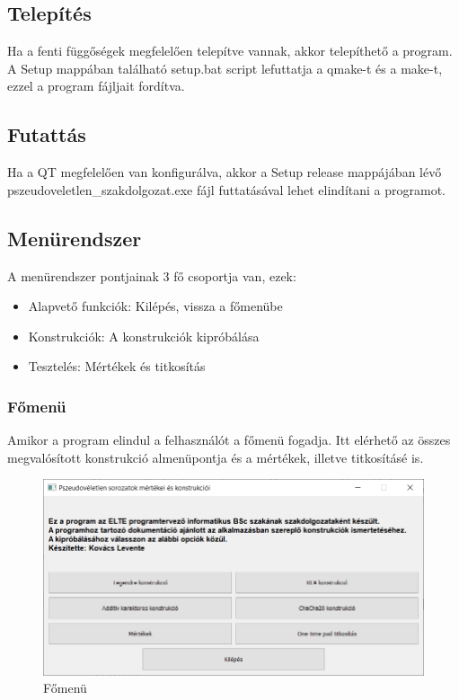 \documentclass[hidelinks, 12pt]{article}
\begin{document}
	\subsection{Telepítés}
	Ha a fenti függőségek megfelelően telepítve vannak, akkor telepíthető a program. A Setup mappában található setup.bat script lefuttatja a qmake-t és a make-t, ezzel a program fájljait fordítva.
	\subsection{Futattás}
	Ha a QT megfelelően van konfigurálva, akkor a Setup release mappájában lévő pszeudoveletlen\_szakdolgozat.exe fájl futtatásával lehet elindítani a programot.
	\subsection{Menürendszer}
	A menürendszer pontjainak 3 fő csoportja van, ezek:
	\begin{itemize}
		\item Alapvető funkciók: Kilépés, vissza a főmenübe
		\item Konstrukciók: A konstrukciók kipróbálása
		\item Tesztelés: Mértékek és titkosítás
	\end{itemize}
	\subsubsection{Főmenü}
	Amikor a program elindul a felhasználót a főmenü fogadja. Itt elérhető az összes megvalósított konstrukció almenüpontja és a mértékek, illetve titkosításé is.
	
	\begin{figure}[h]
		\centering
		\begin{minipage}{\textwidth}
			\includegraphics[width=\textwidth]{mainmenu.png}
		\end{minipage}
		\caption{Főmenü}
	\end{figure}
	
\end{document}
